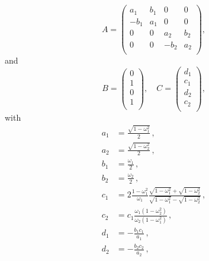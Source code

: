 \documentclass[%
reprint,
superscriptaddress,
amsmath,amssymb,
aps,
prd,
floatfix,
nofootinbib
]{revtex4-1}
\begin{document}
\begin{equation}
  A=\left(
  \begin{array}{cccc}
    a_1 & b_1 & 0 & 0 \\
    -b_1 & a_1 & 0 & 0 \\
    0 & 0 & a_2 & b_2 \\
    0 & 0 & -b_2 & a_2 \\
  \end{array}
  \right),
\end{equation}
and
\begin{equation}
  B=\left(\begin{array}{c}
    0 \\
    1 \\
    0 \\
    1 \\
  \end{array}\right),
  \quad C=\left(\begin{array}{c}
    d_1 \\
    c_1 \\
    d_2 \\
    c_2 \\
  \end{array}\right),
\end{equation}
with
\begin{subequations}\label{ivtparams}
  \begin{align}
    a_1 &=\frac{\sqrt{1-\omega_1^2}}{2}\,,\\
    a_2 &=\frac{\sqrt{1-\omega_2^2}}{2}\,,\\
    b_1 &=\frac{\omega_1}{2}\,,\\
    b_2 &=\frac{\omega_2}{2}\,,\\
    c_1 &= 2\frac{1-\omega_1^2}{\omega_1}
    \frac{\sqrt{1-\omega_1^2}+\sqrt{1-\omega_2^2}}{\sqrt{1-\omega_1^2}-\sqrt{1-\omega_2^2}}\,,\\
    c_2 &= c_1 \frac{\omega_1(1-\omega_2^2)}{\omega_2(1-\omega_1^2)}\,,\\
    d_1 &=-\frac{b_1 c_1}{a_1}\,,\\
    d_2 &=-\frac{b_2 c_2}{a_2}\,,
  \end{align}
\end{subequations}
\end{document}
